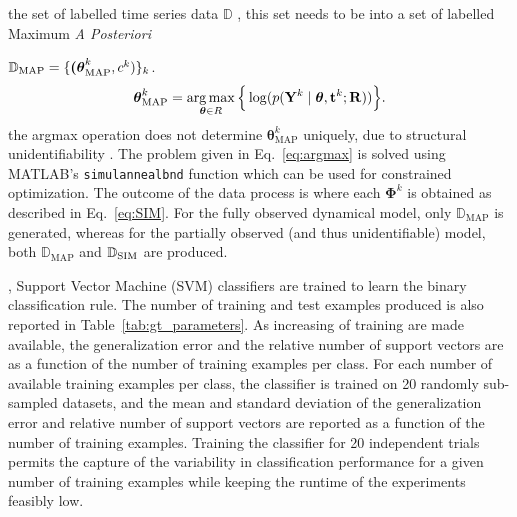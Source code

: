  the set of labelled time series data $\mathbb{D}$ , this set needs to  be into a set of labelled Maximum \emph{A Posteriori}  
{$\mathbb{D}_{\text{MAP}} = \textcolor{black}{\{ \boldsymbol{(\theta}^k_{\text{MAP}}, c^{k}) \}_k}$.
\begin{equation}\label{eq:argmax}
    \boldsymbol{\theta}_{\text{MAP}}^{k} = \operatorname*{arg\,max}_{\boldsymbol{\theta} \in R} \Big\lbrace \log(p(\mathbf{Y}^{k} \mid \boldsymbol{\theta}, \mathbf{t}^{k}; \mathbf{R})) \Big\rbrace.
\end{equation}
 the argmax operation does not determine $\boldsymbol{\theta}_{\text{MAP}}^{k}$ uniquely, due to structural unidentifiability . 
The problem given in Eq.~\eqref{eq:argmax} is solved using MATLAB's {\tt simulannealbnd} function which can be used for constrained optimization. 
The outcome of the data  process is  where each $\boldsymbol{\Phi}^{k}$ is obtained as described in Eq.~\eqref{eq:SIM}.
For the fully observed dynamical model, only $\mathbb{D}_{\text{MAP}}$ is generated, whereas for the partially observed (and thus unidentifiable) model, both $\mathbb{D}_{\text{MAP}}$ and  $\mathbb{D}_{\text{SIM{}}}$ are produced.

, Support Vector Machine (SVM) classifiers are trained to learn the binary classification rule. 
The number of training and test examples produced is also reported in Table~\ref{tab:gt_parameters}.
As  increasing  of training  are made available, the generalization error and the relative number of support vectors are %
 as a function of the number of training examples per class.
For each number of available training examples per class, the classifier is trained on 20 randomly sub-sampled datasets, and the mean and standard deviation of the generalization error 
and relative number of support vectors are reported as a function of the number of training examples.
Training the classifier for 20 independent trials permits the capture of the variability in classification performance for a given number of training examples while keeping the runtime of the experiments feasibly low.

}
